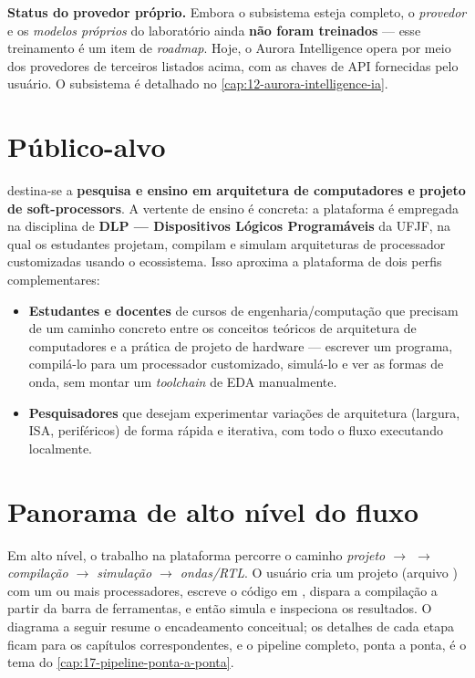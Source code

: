 \begin{nota}
\textbf{Status do provedor próprio.} Embora o subsistema esteja completo, o
\emph{provedor} e os \emph{modelos próprios} do laboratório ainda \textbf{não
foram treinados} --- esse treinamento é um item de \emph{roadmap}. Hoje, o
Aurora Intelligence opera por meio dos provedores de terceiros listados acima,
com as chaves de API fornecidas pelo usuário. O subsistema é detalhado no
\autoref{cap:12-aurora-intelligence-ia}.
\end{nota}

\section{Público-alvo}
\label{sec:01-publico}

 destina-se a \textbf{pesquisa e ensino em arquitetura de
computadores e projeto de soft-processors}. A vertente de ensino é concreta: a
plataforma é empregada na disciplina de \textbf{DLP --- Dispositivos Lógicos
Programáveis} da UFJF, na qual os estudantes projetam, compilam e simulam
arquiteturas de processador customizadas usando o ecossistema. Isso aproxima a
plataforma de dois perfis complementares:

\begin{itemize}
  \item \textbf{Estudantes e docentes} de cursos de engenharia/computação que
        precisam de um caminho concreto entre os conceitos teóricos de
        arquitetura de computadores e a prática de projeto de hardware ---
        escrever um programa, compilá-lo para um processador customizado,
        simulá-lo e ver as formas de onda, sem montar um \emph{toolchain} de
        EDA manualmente.
  \item \textbf{Pesquisadores} que desejam experimentar variações de
        arquitetura (largura, ISA, periféricos) de forma rápida e iterativa,
        com todo o fluxo executando localmente.
\end{itemize}

\section{Panorama de alto nível do fluxo}
\label{sec:01-fluxo}

Em alto nível, o trabalho na plataforma percorre o caminho \emph{projeto $\to$
\cmm{} $\to$ compilação $\to$ simulação $\to$ ondas/RTL}. O usuário cria um
projeto (arquivo ) com um ou mais processadores, escreve o código em
\cmm{}, dispara a compilação a partir da barra de ferramentas, e então simula e
inspeciona os resultados. O diagrama a seguir resume o encadeamento conceitual;
os detalhes de cada etapa ficam para os capítulos correspondentes, e o pipeline
completo, ponta a ponta, é o tema do \autoref{cap:17-pipeline-ponta-a-ponta}.

